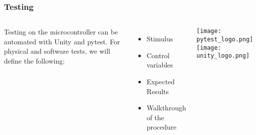 \documentclass{beamer}
\begin{document}
\begin{frame}
  \frametitle{Testing}

  \begin{columns}
    Testing on the microcontroller can be automated with Unity and pytest.
    \newline
    \newline
    For physical and software tests, we will define the following:
    \begin{itemize}
      \item Stimulus
      \item Control variables
      \item Expected Results
      \item Walkthrough of the procedure
    \end{itemize}

    \texttt{[image: pytest\_logo.png]} \\
    \texttt{[image: unity\_logo.png]}

  \end{columns}


\end{frame}
\end{document}
